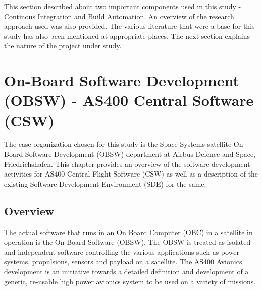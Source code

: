 \documentclass[12pt, a4paper, titlepage]{scrartcl}
\begin{document}
\par This section described about two important components used in this study - Continous Integration and Build Automation. An overview of the research approach used was also provided. The various literature that were a base for this study has also been mentioned at appropriate places. The next section explains the nature of the project under study. 
\pagebreak

\section{On-Board Software Development (OBSW) - AS400 Central Software (CSW)}
The case organization chosen for this study is the Space Systems satellite On-Board Software Development (OBSW) department at Airbus Defence and Space, Friedrichshafen. This chapter provides an overview of the software development activities for AS400 Central Flight Software (CSW) as well as a description of the existing Software Development Environment (SDE) for the same.
\subsection{Overview}
The actual software that runs in an On Board Computer (OBC)\cite{cooper1976development} in a satellite in operation is the On Board Software (OBSW). The OBSW is treated as isolated and independent software controlling the various applications such as power systems, propulsions, sensors and payload on a satellite. The AS400 Avionics development is an initiative towards a detailed definition and development of a generic, re-usable high power avionics system to be used on a variety of missions. 
\end{document}
